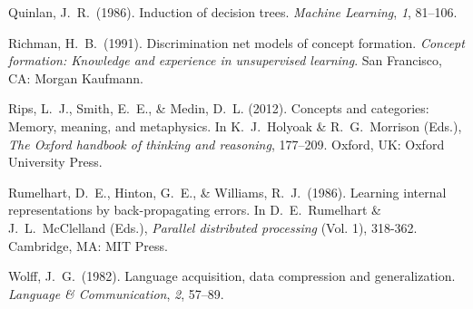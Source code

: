 \documentclass[11pt,letterpaper]{article}
\begin{document}
{Quinlan, J.\ R.\ (1986). Induction of decision trees. {\it Machine 
Learning\/}, {\it 1\/}, 81--106.

Richman, H.\ B.\ (1991). Discrimination net models of concept 
formation. {\it Concept formation: Knowledge and experience in 
unsupervised learning\/}. San Francisco, CA: Morgan Kaufmann.

Rips, L.\ J., Smith, E.\ E., \& Medin, D.\ L. (2012). Concepts and
categories: Memory, meaning, and metaphysics. In K.\ J.\ Holyoak \&
R.\ G.\ Morrison (Eds.), {\it The Oxford handbook of thinking and
reasoning\/}, 177--209. Oxford, UK: Oxford University Press. 

Rumelhart, D.\ E., Hinton, G.\ E., \& Williams, R.\ J.\ (1986). Learning
internal representations by back-propagating errors. In D.\ E.\ Rumelhart
\& J.\ L.\ McClelland (Eds.), {\it Parallel distributed processing\/}
(Vol. 1), 318-362. Cambridge, MA: MIT Press.


Wolff, J.\ G.\ (1982). Language acquisition, data compression 
and generalization. {\it Language \& Communication\/}, {\it 2\/}, 
57--89. 

}
\end{document}
